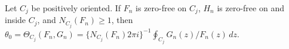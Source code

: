 Let \(C_j\) be positively oriented. If \(F_n\) is zero-free on \(C_j\), \(H_n\) is zero-free on and inside \(C_j\), and \(N_{C_j}(F_n)\ge1\), then \(\theta_0=\Theta_{C_j}(F_n,G_n)=\{N_{C_j}(F_n)2\pi i\}^{-1}\oint_{C_j}G_n(z)/F_n(z)\,dz\).